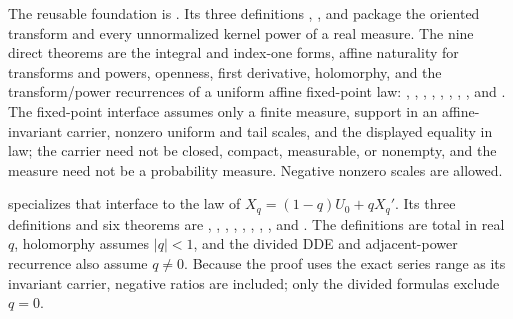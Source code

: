\documentclass[11pt,oneside]{article}
\theoremstyle{definition}
\theoremstyle{remark}
\newcommand{\1}{\mathbf 1}
\begin{document}
\begin{statusbox}
The reusable foundation is .  Its three definitions
, , and
 package the oriented transform and every unnormalized
kernel power of a real measure.  The nine direct theorems are the integral and index-one
forms, affine naturality for transforms and powers, openness, first derivative,
holomorphy, and the transform/power recurrences of a uniform affine fixed-point law:
,
,
,
,
,
,
,
, and
.
The fixed-point interface assumes only a finite measure, support in an affine-invariant
carrier, nonzero uniform and tail scales, and the displayed equality in law; the carrier
need not be closed, compact, measurable, or nonempty, and the measure need not be a
probability measure.  Negative nonzero scales are allowed.

 specializes that interface to the law of
\(X_q=(1-q)U_0+qX_q'\).  Its three definitions and six theorems are
,
,
,
,
,
,
,
, and
.  The definitions are total in real
\(q\), holomorphy assumes \(|q|<1\), and the divided DDE and adjacent-power recurrence
also assume \(q\ne0\).  Because the proof uses the exact series range as its invariant
carrier, negative ratios are included; only the divided formulas exclude \(q=0\).


\end{statusbox}
\end{document}
